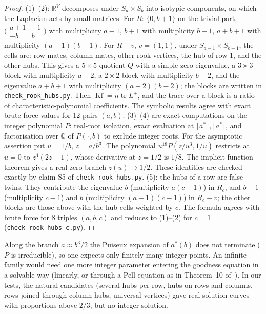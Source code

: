 \documentclass[11pt,a4paper]{report}
\newcommand*{\Kf}{\operatorname{Kf}}
\begin{document}
\begin{proof}
(1)--(2): \(\mathbb R^{V}\) decomposes under \(S_a\times S_b\) into isotypic components, on which the Laplacian acts by
small matrices. For \(R\): \(\{0,b+1\}\) on the trivial part, \(\bigl(\begin{smallmatrix}a+1&-1\\-b&b\end{smallmatrix}\bigr)\)
with multiplicity \(a-1\), \(b+1\) with multiplicity \(b-1\), \(a+b+1\) with multiplicity \((a-1)(b-1)\). For \(R-v\),
\(v=(1,1)\), under \(S_{a-1}\times S_{b-1}\), the cells are: row-mates, column-mates, other rook vertices, the hub of
row 1, and the other hubs. This gives a \(5\times5\) quotient \(Q\) with a simple zero eigenvalue, a \(3\times3\) block
with multiplicity \(a-2\), a \(2\times2\) block with multiplicity \(b-2\), and the eigenvalue \(a+b+1\) with
multiplicity \((a-2)(b-2)\); the blocks are written in \texttt{check\_rook\_hubs.py}. Then
\(\Kf=n\operatorname{tr}L^+\), and the trace over a block is a ratio of characteristic-polynomial coefficients. The
symbolic results agree with exact brute-force values for 12 pairs \((a,b)\). (3)--(4) are exact computations on the
integer polynomial \(P\): real-root isolation, exact evaluation at \(\lfloor a^*\rfloor,\lceil a^*\rceil\), and
factorisation over \(\mathbb Q\) of \(P(\cdot,b)\) to exclude integer roots. For the asymptotic assertion put
\(u=1/b\), \(z=a/b^3\). The polynomial \(u^{18}P(z/u^3,1/u)\) restricts at \(u=0\) to
\(z^4(2z-1)\), whose derivative at \(z=1/2\) is \(1/8\). The implicit function theorem gives a real zero branch
\(z(u)\to1/2\). These identities are checked exactly by claim S5 of \texttt{check\_rook\_hubs.py}.
(5): the hubs of a row are false twins.
They contribute the eigenvalue \(b\) (multiplicity \(a(c-1)\)) in \(R_c\), and \(b-1\) (multiplicity \(c-1\)) and \(b\)
(multiplicity \((a-1)(c-1)\)) in \(R_c-v\); the other blocks are those above with the hub cells weighted by \(c\). The
formula agrees with brute force for 8 triples \((a,b,c)\) and reduces to (1)--(2) for \(c=1\)
(\texttt{check\_rook\_hubs\_c.py}).
\end{proof}

Along the branch \(a\approx b^3/2\) the Puiseux expansion of \(a^*(b)\) does not terminate (\(P\) is irreducible), so
one expects only finitely many integer points. An infinite family would need one more integer parameter entering the
goodness equation in a solvable way (linearly, or through a Pell equation as in Theorem~10 of~\autocite{GMD2026}). In
our tests, the natural candidates (several hubs per row, hubs on rows and columns, rows joined through column hubs,
universal vertices) gave real solution curves with proportions above \(2/3\), but no integer solution.
\end{document}
